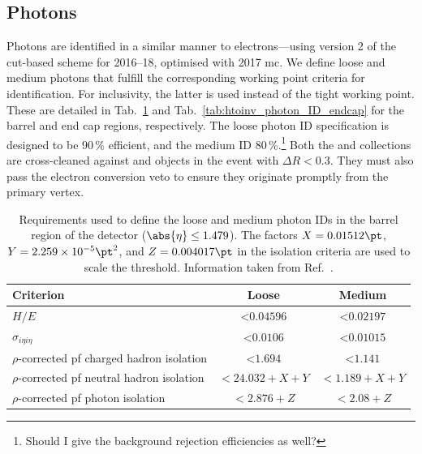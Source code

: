 

\subsection{Photons}
\label{subsec:htoinv_photon_objs}

Photons are identified in a similar manner to electrons---using version 2 of the cut-based scheme for 2016--18, optimised with 2017 \acrlong{mc}. We define loose \loosePhoton and medium photons \mediumPhoton that fulfill the corresponding working point criteria for identification. For inclusivity, the latter is used instead of the tight working point. These are detailed in Tab.~\ref{tab:htoinv_photon_ID_barrel} and Tab.~\ref{tab:htoinv_photon_ID_endcap} for the barrel and end cap regions, respectively. The loose photon ID specification is designed to be 90\,\% efficient, and the medium ID 80\,\%.\footnote{Should I give the background rejection efficiencies as well?} Both the \loosePhoton and \mediumPhoton collections are cross-cleaned against \looseMuon and \vetoEle objects in the event with $\Delta R < \text{0.3}$. They must also pass the electron conversion veto to ensure they originate promptly from the primary vertex.

\begin{table}[htbp]
    \centering
    \begin{tabular}{lcc}
        \hline
        Criterion & Loose & Medium \\\hline
        $H/E$ & $< \text{0.04596}$ & $< \text{0.02197}$ \\
        $\sigma_{i\eta i\eta}$ & $< \text{0.0106}$ & $< \text{0.01015}$ \\
        $\rho$-corrected \acrshort{pf} charged hadron isolation & $< \text{1.694}$ & $< \text{1.141}$ \\
        $\rho$-corrected \acrshort{pf} neutral hadron isolation & $< \text{24.032} + X + Y$ & $< \text{1.189} + X + Y$ \\
        $\rho$-corrected \acrshort{pf} photon isolation & $< \text{2.876} + Z$ & $< \text{2.08} + Z$ \\\hline
    \end{tabular}
    \caption[Requirements used to define the loose and medium photon IDs in the barrel region of the detector ($\abs{\eta} \leq \text{1.479}$)]{Requirements used to define the loose and medium photon IDs in the barrel region of the detector ($\abs{\eta} \leq \text{1.479}$). The factors $X = \text{0.01512}\pt$, $Y = \text{2.259} \times \text{10}^{-5}\pt^2$, and $Z = \text{0.004017}\pt$ in the isolation criteria are used to scale the threshold. Information taken from Ref.~.}
    \label{tab:htoinv_photon_ID_barrel}
\end{table}

